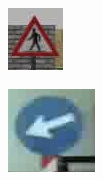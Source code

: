 \begin{figure}[h]
  \centering
  \begin{subfigure}[b]{0.15\linewidth}
    \includegraphics[width=\linewidth]{figures/signs/PedestrianCrossing.jpg}
    \caption{}
  \end{subfigure}
  \begin{subfigure}[b]{0.15\linewidth}
    \includegraphics[width=\linewidth]{figures/signs/KeepLeft.jpg}

\end{subfigure}
\end{figure}

